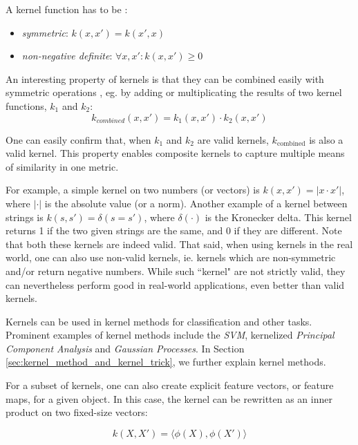 A kernel function has to be \cite{Kriege2012}:
\begin{itemize}
    \item{\textit{symmetric}: $k(x, x') = k(x', x)$}
    \item{\textit{non-negative definite}: $\forall x, x': k(x, x') \geq 0$}
\end{itemize}

An interesting property of kernels is that they can be combined easily with symmetric operations \cite[p.~296]{Bishop2006}, eg. by adding or multiplicating the results of two kernel functions, $k_1$ and $k_2$:
\begin{equation*}
k_{combined}(x, x') = k_1(x, x') \cdot k_2(x, x')
\end{equation*}

One can easily confirm that, when $k_1$ and $k_2$ are valid kernels, $k_{\mathrm{combined}}$ is also a valid kernel.
This property enables composite kernels to capture multiple means of similarity in one metric.

For example, a simple kernel on two numbers (or vectors) is $k(x, x') = | x \cdot x' |$, where $| \cdot |$ is the absolute value (or a norm).
Another example of a kernel between strings is $k(s, s') = \delta(s = s')$, where $\delta(\cdot)$ is the Kronecker delta. This kernel returns 1 if the two given strings are the same, and 0 if they are different.
Note that both these kernels are indeed valid.
That said, when using kernels in the real world, one can also use non-valid kernels, ie. kernels which are non-symmetric and/or return negative numbers. While such ``kernel" are not strictly valid, they can nevertheless perform good in real-world applications, even better than valid kernels.

Kernels can be used in kernel methods for classification and other tasks.
Prominent examples of kernel methods include the \textit{SVM}, kernelized \textit{Principal Component Analysis} and \textit{Gaussian Processes}.
In Section \ref{sec:kernel_method_and_kernel_trick}, we further explain kernel methods.

For a subset of kernels, one can also create explicit feature vectors, or feature maps, for a given object. In this case, the kernel can be rewritten as an inner product on two fixed-size vectors:

\begin{equation*}
    k(X, X') = \langle \phi(X), \phi(X') \rangle
\end{equation*}

